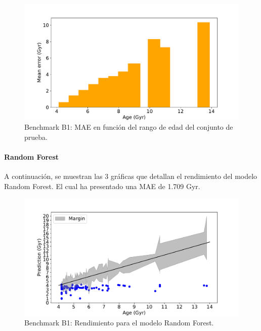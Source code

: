 \begin{figure}[H]
\begin{center}
 \includegraphics[width=0.8\linewidth]{Figuras/Experimentos/B_B1_knn_3.pdf}
\end{center}
\caption{Benchmark B1: MAE en función del rango de edad del conjunto de prueba.}
 \label{fig:benchB1_details_knn_3}
\end{figure}

\paragraph{Random Forest} 
A continuación, se muestran las 3 gráficas que detallan el rendimiento del modelo Random Forest. El cual ha presentado una MAE de 1.709 Gyr.%

\begin{figure}[H]
\begin{center}
 \includegraphics[width=0.8\linewidth]{Figuras/Experimentos/B_B1_rf_1.pdf}
\end{center}
\caption{Benchmark B1: Rendimiento para el modelo Random Forest.}
 \label{fig:benchB1_details_rf_1}
\end{figure}


